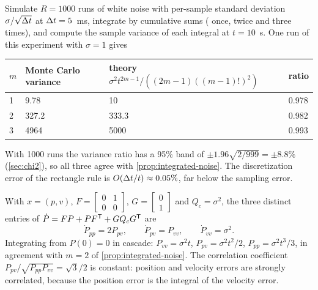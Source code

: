 \begin{solutions}
  \item Simulate $R = 1000$ runs of white noise with per-sample standard deviation $\sigma/\sqrt{{\Delta t}}$ at ${\Delta t} = 5$~ms, integrate by cumulative sums
        ( once, twice and three times), and compute the sample variance of each integral at $t = 10$~s. One run of
        this experiment with $\sigma = 1$ gives
        \begin{center}\small
        \begin{tabular}{@{}l l l l@{}}
        \toprule
        $m$ & Monte Carlo variance & theory $\sigma^2t^{2m-1}/((2m-1)((m-1)!)^2)$ & ratio \\
        \midrule
        1 & 9.78 & 10 & 0.978 \\
        2 & 327.2 & 333.3 & 0.982 \\
        3 & 4964 & 5000 & 0.993 \\
        \bottomrule
        \end{tabular}
        \end{center}
        With 1000 runs the variance ratio has a 95\% band of $\pm1.96\sqrt{2/999} = \pm8.8\%$ (\cref{sec:chi2}), so all three agree with
        \cref{prop:integrated-noise}. The discretization error of the rectangle rule is $O({\Delta t}/t) \approx 0.05\%$, far below the sampling error.

  \item With $x = (p, v)$, $F = \begin{bmatrix}0 & 1\\0 & 0\end{bmatrix}$, $G = \begin{bmatrix}0\\1\end{bmatrix}$ and $Q_c = \sigma^2$, the three distinct entries of
        $\dot P = FP + PF^{\mathsf{T}} + GQ_cG^{\mathsf{T}}$ are
        \[
          \dot P_{pp} = 2P_{pv}, \qquad \dot P_{pv} = P_{vv}, \qquad \dot P_{vv} = \sigma^2 .
        \]
        Integrating from $P(0) = 0$ in cascade: $P_{vv} = \sigma^2t$, $P_{pv} = \sigma^2t^2/2$, $P_{pp} = \sigma^2t^3/3$, in agreement with $m = 2$ of
        \cref{prop:integrated-noise}. The correlation coefficient $P_{pv}/\sqrt{P_{pp}P_{vv}} = \sqrt3/2$ is constant: position and velocity errors are
        strongly correlated, because the position error is the integral of the velocity error.


\end{solutions}
